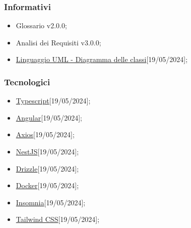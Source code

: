 \subsubsection{Informativi}
\begin{itemize}
	\item Glossario v2.0.0;
	\item Analisi dei Requisiti v3.0.0;
	\item \href{https://www.math.unipd.it/~rcardin/swea/2023/Diagrammi\%20delle\%20Classi.pdf}
		{Linguaggio UML - Diagramma delle classi}[19/05/2024];
\end{itemize}

\subsubsection{Tecnologici}
\begin{itemize}
	\item \href{https://www.typescriptlang.org/}
		{Typescript}[19/05/2024];

	\item \href{https://angular.io/}
		{Angular}[19/05/2024];

	\item \href{https://axios-http.com/}
		{Axios}[19/05/2024];

	\item \href{https://nestjs.com/}
		{NestJS}[19/05/2024];

	\item \href{https://orm.drizzle.team/}
		{Drizzle}[19/05/2024];

	\item \href{https://www.docker.com/}
		{Docker}[19/05/2024];

	\item \href{https://insomnia.rest/}
		{Insomnia}[19/05/2024];

	\item \href{https://tailwindcss.com/}
		{Tailwind CSS}[19/05/2024];
\end{itemize}

